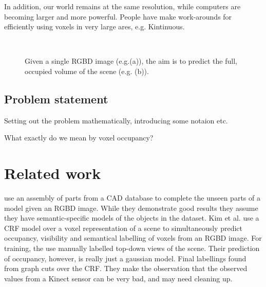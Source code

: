 \documentclass[10pt,a4paper]{article}
\makeatletter
\newcommand*{\eg}{e.g.\@\xspace}
\newcommand*{\ea}{et al.\@\xspace}
\makeatother
\begin{document}
In addition, our world remains at the same resolution, while computers are becoming larger and more powerful. 
People have make work-arounds for efficiently using voxels in very large ares, \eg Kintinuous.



\begin{figure}
	\centering 
		\hfill
	 \\
	\caption{Given a single RGBD image (\eg (a)), the aim is to predict the full, occupied volume of the scene (e.g. (b)).}
\end{figure}

\subsection{Problem statement}

Setting out the problem mathematically, introducing some notaion etc.

What exactly do we mean by voxel occupancy? 

\section{Related work}

\cite{shen-tog-2012} use an assembly of parts from a CAD database to complete the unseen parts of a model given an RGBD image. 
While they demonstrate good results they assume they have semantic-specific models of the objects in the dataset.
Kim \ea \cite{kim-iccv-2013} use a CRF model over a voxel representation of a scene to simultaneously predict occupancy, visibility and semantical labelling of voxels from an RGBD image. 
For training, the use manually labelled top-down views of the scene. 
Their prediction of occupancy, however, is really just a gaussian model. 
Final labellings found from graph cuts over the CRF. 
They make the observation that the observed values from a Kinect sensor can be very bad, and may need cleaning up.
\end{document}
